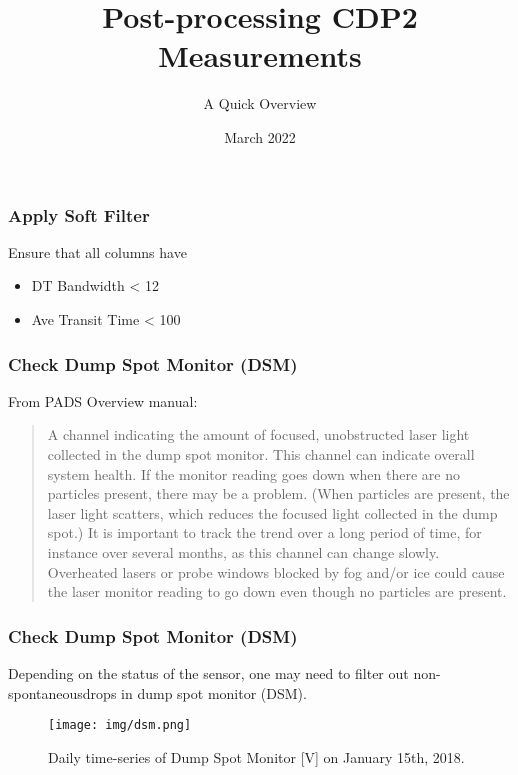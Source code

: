 \documentclass{beamer}
\title{Post-processing CDP2 Measurements}
\subtitle{A Quick Overview}
\date{March 2022}
\begin{document}
\frame{\titlepage}

\begin{frame}
    \frametitle{Apply Soft Filter}
    Ensure that all columns have

    \begin{itemize}
        \item DT Bandwidth < 12
        \item Ave Transit Time < 100\footnotemark
    \end{itemize}

\end{frame}

\begin{frame}
    \frametitle{Check Dump Spot Monitor (DSM)}
    From PADS Overview manual:

    \begin{quote}
        \small{A channel indicating the amount of focused, unobstructed laser light collected in the dump spot monitor. This channel can indicate overall system health. If the monitor reading goes down when there are no particles present, there may be a problem. (When particles are present, the laser light scatters, which reduces the focused light collected in the dump spot.) It is important to track the trend over a long period of time, for instance over several months, as this channel can change slowly. Overheated lasers or probe windows blocked by fog and/or ice could cause the laser monitor reading to go down even though no particles are present.}
    \end{quote}
\end{frame}

\begin{frame}
    \frametitle{Check Dump Spot Monitor (DSM)}
    Depending on the status of the sensor, one may need to filter out non-spontaneous\footnotemark drops in dump spot monitor (DSM).

    \begin{figure}
        \centering
        \texttt{[image: img/dsm.png]}
        \caption{Daily time-series of Dump Spot Monitor [V] on January 15th, 2018.}
    \end{figure}

\end{frame}
\end{document}
